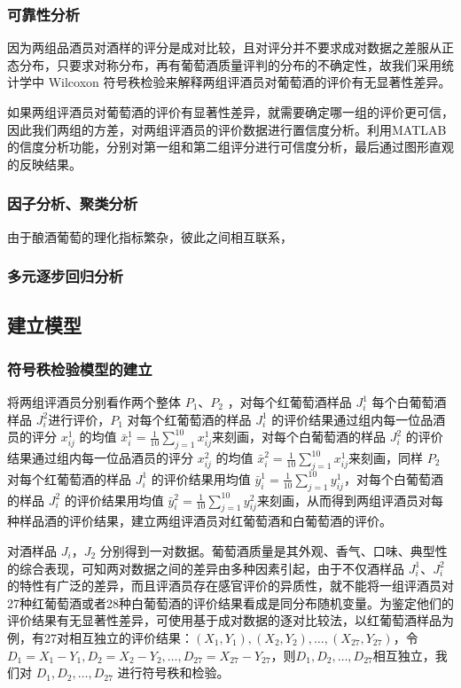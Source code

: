 \documentclass[nocover]{cumcmart}%
\begin{document}
        \subsubsection{可靠性分析}
        因为两组品酒员对酒样的评分是成对比较，且对评分并不要求成对数据之差服从正态分布，只要求对称分布，再有葡萄酒质量评判的分布的不确定性，故我们采用统计学中 Wilcoxon 符号秩检验来解释两组评酒员对葡萄酒的评价有无显著性差异。

        如果两组评酒员对葡萄酒的评价有显著性差异，就需要确定哪一组的评价更可信，因此我们两组的方差，对两组评酒员的评价数据进行置信度分析。利用MATLAB的信度分析功能，分别对第一组和第二组评分进行可信度分析，最后通过图形直观的反映结果。

        \subsubsection{因子分析、聚类分析}
        由于酿酒葡萄的理化指标繁杂，彼此之间相互联系，


        \subsubsection{多元逐步回归分析}

    \subsection{建立模型}

        \subsubsection{符号秩检验模型的建立}
    将两组评酒员分别看作两个整体 ${P_1}$、${P_2}$ ，对每个红葡萄酒样品 ${J_{i}^{1}}$ 每个白葡萄酒样品 ${J_{i}^{2}}$进行评价，${P_1}$ 对每个红葡萄酒的样品 ${J_{i}^{1}}$ 的评价结果通过组内每一位品酒员的评分 ${x_{ij}^{1}}$ 的均值 $\bar{x}_{i}^1 = \frac{1}{10}\sum\limits_{j=1}^{10}x_{ij}^{1}$来刻画，对每个白葡萄酒的样品 ${J_{i}^{2}}$ 的评价结果通过组内每一位品酒员的评分 ${x_{ij}^{2}}$ 的均值 ${\bar{x}_{i}^{2}} = \frac{1}{10}\sum\limits_{j=1}^{10}x_{ij}^{1}$来刻画，同样 ${P_2}$ 对每个红葡萄酒的样品 ${J_{i}^{1}}$ 的评价结果用均值 ${\bar{y}_{i}^{1}} = \frac{1}{10}\sum\limits_{j=1}^{10}y_{ij}^{1}$，对每个白葡萄酒的样品 ${J_{i}^{2}}$ 的评价结果用均值 ${\bar{y}_{i}^{2}} = \frac{1}{10}\sum\limits_{j=1}^{10}y_{ij}^{2}$来刻画，从而得到两组评酒员对每种样品酒的评价结果，建立两组评酒员对红葡萄酒和白葡萄酒的评价。

    对酒样品 ${J_i}$，${J_2}$ 分别得到一对数据。葡萄酒质量是其外观、香气、口味、典型性的综合表现\cite{1}，可知两对数据之间的差异由多种因素引起，由于不仅酒样品 ${J_{i}^{1}}$、${J_{i}^{2}}$ 的特性有广泛的差异，而且评酒员存在感官评价的异质性\cite{2}，就不能将一组评酒员对27种红葡萄酒或者28种白葡萄酒的评价结果看成是同分布随机变量。为鉴定他们的评价结果有无显著性差异，可使用基于成对数据的逐对比较法，以红葡萄酒样品为例，有27对相互独立的评价结果：${(X_1,Y_1),(X_2,Y_2),\ldots,(X_{27},Y_{27})}$，令${D_1 = X_1 - Y_1,D_2 = X_2 - Y_2,\ldots,D_{27} = X_{27} - Y_{27}}$，则${D_1,D_2,\ldots,D_{27}}$相互独立，我们对 ${D_1,D_2,\ldots,D_{27}}$ 进行符号秩和检验。
\end{document}
